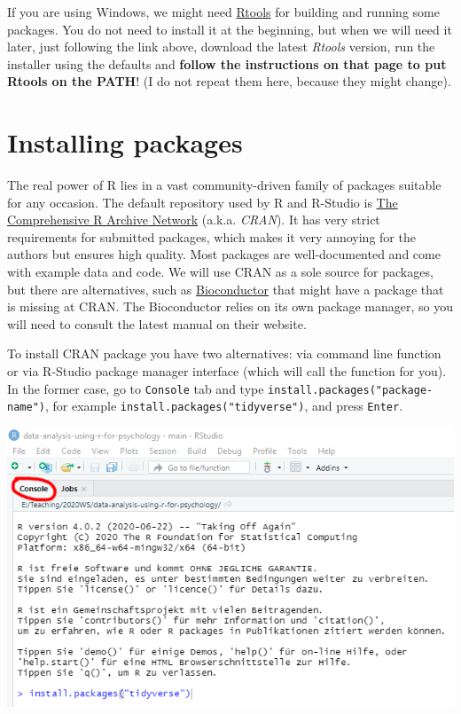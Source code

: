 \documentclass[
]{book}
\begin{document}
If you are using Windows, we might need \href{https://cran.r-project.org/bin/windows/Rtools/}{Rtools} for building and running some packages. You do not need to install it at the beginning, but when we will need it later, just following the link above, download the latest \emph{Rtools} version, run the installer using the defaults and \textbf{follow the instructions on that page to put Rtools on the PATH}! (I do not repeat them here, because they might change).

\hypertarget{install.packages}{%
\section*{Installing packages}\label{install.packages}}

The real power of R lies in a vast community-driven family of packages suitable for any occasion. The default repository used by R and R-Studio is \href{https://cran.r-project.org/}{The Comprehensive R Archive Network} (a.k.a. \emph{CRAN}). It has very strict requirements for submitted packages, which makes it very annoying for the authors but ensures high quality. Most packages are well-documented and come with example data and code. We will use CRAN as a sole source for packages, but there are alternatives, such as \href{http://www.bioconductor.org/}{Bioconductor} that might have a package that is missing at CRAN. The Bioconductor relies on its own package manager, so you will need to consult the latest manual on their website.

To install CRAN package you have two alternatives: via command line function or via R-Studio package manager interface (which will call the function for you). In the former case, go to \texttt{Console} tab and type \texttt{install.packages("package-name")}, for example \texttt{install.packages("tidyverse")}, and press \texttt{Enter}.

\begin{center}\includegraphics[width=1\linewidth]{images/install-packages-cmd} \end{center}
\end{document}
